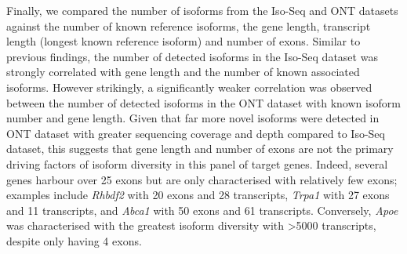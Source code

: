 \begin{figure}[t]
	\captionsetup{width=0.95\textwidth}
\end{figure}



Finally, we compared the number of isoforms from the Iso-Seq and ONT datasets against the number of known reference isoforms, the gene length, transcript length (longest known reference isoform) and number of exons. Similar to previous findings, the number of detected isoforms in the Iso-Seq dataset was strongly correlated with gene length and the number of known associated isoforms. However strikingly, a significantly weaker correlation was observed between the number of detected isoforms in the ONT dataset with known isoform number and gene length. Given that far more novel isoforms were detected in ONT dataset with greater sequencing coverage and depth compared to Iso-Seq dataset, this suggests that gene length and number of exons are not the primary driving factors of isoform diversity in this panel of target genes. Indeed, several genes harbour over 25 exons but are only characterised with relatively few exons; examples include \textit{Rhbdf2} with 20 exons and 28 transcripts, \textit{Trpa1} with 27 exons and 11 transcripts, and \textit{Abca1} with 50 exons and 61 transcripts. Conversely, \textit{Apoe} was characterised with the greatest isoform diversity with >5000 transcripts, despite only having 4 exons. 



